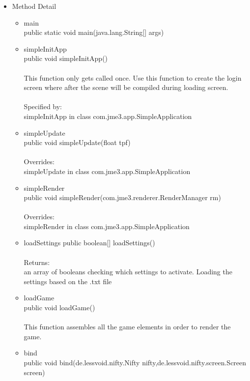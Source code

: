 \documentclass[letterpaper]{article}
\begin{document}
\begin{itemize}
							\item	Method Detail
									\begin{itemize}
										\item	main \\
												public static void main(java.lang.String[] args)
										\item	simpleInitApp \\
												public void simpleInitApp() \\ \\
												This function only gets called once. Use this function to create the login screen where after the scene will be compiled during loading screen. \\ \\
												Specified by: \\
												simpleInitApp in class com.jme3.app.SimpleApplication
										\item	simpleUpdate \\
												public void simpleUpdate(float tpf) \\ \\
												Overrides: \\
												simpleUpdate in class com.jme3.app.SimpleApplication
										\item	simpleRender \\
												public void simpleRender(com.jme3.renderer.RenderManager rm) \\ \\
												Overrides: \\
												simpleRender in class com.jme3.app.SimpleApplication
										\item	loadSettings
												public boolean[] loadSettings() \\ \\
												Returns: \\
												an array of booleans checking which settings to activate. Loading the settings based on the .txt file
										\item	loadGame \\
												public void loadGame() \\ \\
												This function assembles all the game elements in order to render the game.
										\item	bind \\
												public void bind(de.lessvoid.nifty.Nifty nifty,de.lessvoid.nifty.screen.Screen screen) \\ \\

\end{itemize}
\end{itemize}
\end{document}
